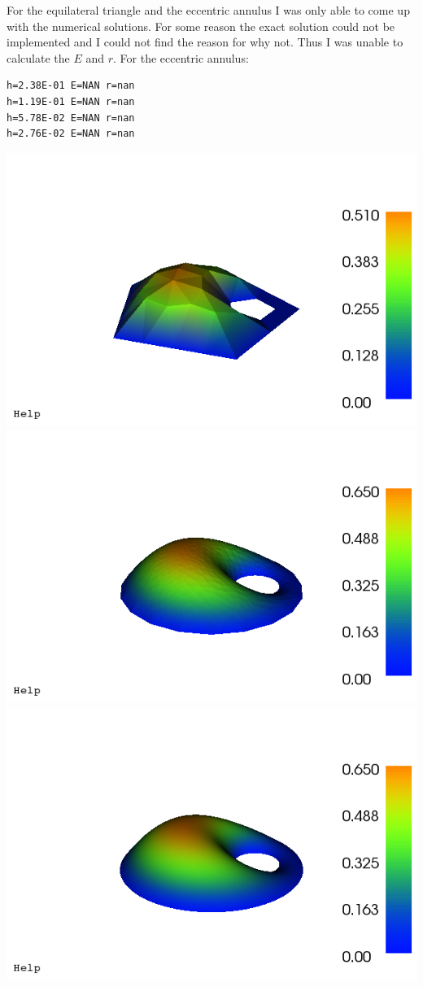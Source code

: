 \documentclass{article}
\begin{document}
\begin{enumerate}
For the equilateral triangle and the eccentric annulus I was only able to come up with the numerical solutions. For some reason the exact solution could not be implemented and I could not find the reason for why not. Thus I was unable to calculate the $E$ and $r$.
For the eccentric annulus: 
\begin{verbatim}
h=2.38E-01 E=NAN r=nan
h=1.19E-01 E=NAN r=nan
h=5.78E-02 E=NAN r=nan
h=2.76E-02 E=NAN r=nan
\end{verbatim}
\includegraphics[scale=0.3]{dolfin_plot_6.png}
\includegraphics[scale=0.3]{dolfin_plot_7.png}\\
\includegraphics[scale=0.3]{dolfin_plot_8.png}\\


\end{enumerate}
\end{document}
